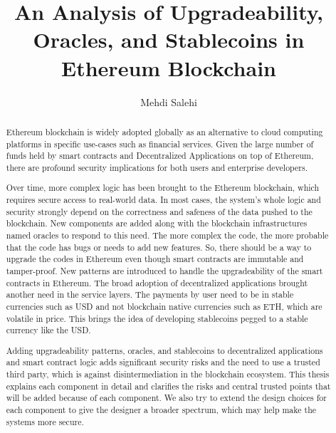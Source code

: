 \documentclass[letterpaper,12pt,onecolumn,final]{report}
\author{Mehdi Salehi}
\title{An Analysis of Upgradeability, Oracles, and Stablecoins in Ethereum Blockchain}
\begin{document}
\begin{abstract}
{%

Ethereum blockchain is widely adopted globally as an alternative to cloud computing platforms in specific use-cases such as financial services. Given the large number of funds held by smart contracts and Decentralized Applications on top of Ethereum, there are profound security implications for both users and enterprise developers.

Over time, more complex logic has been brought to the Ethereum blockchain, which requires secure access to real-world data. In most cases, the system's whole logic and security strongly depend on the correctness and safeness of the data pushed to the blockchain. New components are added along with the blockchain infrastructures named oracles to respond to this need.
The more complex the code, the more probable that the code has bugs or needs to add new features. So, there should be a way to upgrade the codes in Ethereum even though smart contracts are immutable and tamper-proof. New patterns are introduced to handle the upgradeability of the smart contracts in Ethereum. The broad adoption of decentralized applications brought another need in the service layers. The payments by user need to be in stable currencies such as USD and not blockchain native currencies such as ETH, which are volatile in price. This brings the idea of developing stablecoins pegged to a stable currency like the USD.

Adding upgradeability patterns, oracles, and stablecoins to decentralized applications and smart contract logic adds significant security risks and the need to use a trusted third party, which is against disintermediation in the blockchain ecosystem. This thesis explains each component in detail and clarifies the risks and central trusted points that will be added because of each component. We also try to extend the design choices for each component to give the designer a broader spectrum, which may help make the systems more secure.   


}
\end{abstract}

\begin{acknowledgments}

\end{acknowledgments}


\end{document}
